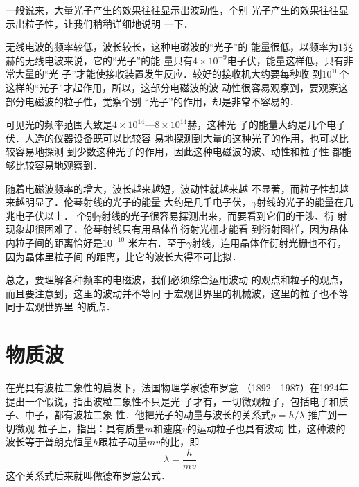 一般说来，大量光子产生的效果往往显示出波动性，个别
光子产生的效果往往显示出粒子性，让我们稍稍详细地说明
一下．

无线电波的频率较低，波长较长，这种电磁波的“光子”的
能量很低，以频率为1兆赫的无线电波来说，它的“光子”的能
量只有$4\times10^{-9}$电子伏，能量这样低，只有非常大量的“光
子”才能使接收装置发生反应．较好的接收机大约要每秒收
到$10^{10}$个这样的“光子”才起作用，所以，这部分电磁波的波
动性很容易观察到，要观察这部分电磁波的粒子性，觉察个别
“光子”的作用，却是非常不容易的．

可见光的频率范围大致是$4\times10^{14}$—$8\times10^{14}$赫，这种光
子的能量大约是几个电子伏．人造的仪器设备既可以比较容
易地探测到大量的这种光子的作用，也可以比较容易地探测
到少数这种光子的作用，因此这种电磁波的波、动性和粒子性
都能够比较容易地观察到．

随着电磁波频率的增大，波长越来越短，波动性就越来越
不显著，而粒子性却越来越明显了．伦琴射线的光子的能量
大约是几千电子伏，$\gamma$射线的光子的能量在几兆电子伏以上．
个别$\gamma$射线的光子很容易探测出来，而要看到它们的干涉、衍
射现象却很困难了．伦琴射线只有用晶体作衍射光栅才能看
到衍射图样，因为晶体内粒子间的距离恰好是$10^{-10}$
米左右．至于$\gamma$射线，连用晶体作衍射光栅也不行，因为晶体里粒子间
的距离，比它的波长大得不可比拟．

总之，要理解各种频率的电磁波，我们必须综合运用波动
的观点和粒子的观点，而且要注意到，这里的波动并不等同
于宏观世界里的机械波，这里的粒子也不等同于宏观世界里
的质点．

\section{物质波}
在光具有波粒二象性的启发下，法国物理学家德布罗意
（1892—1987）在1924年提出一个假说，指出波粒二象性不只是光
子才有，一切微观粒子，包括电子和质子、中子，都有波粒二象
性．他把光子的动量与波长的关系式$p=h/\lambda$
推广到一切微观
粒子上，指出：具有质量$m$和速度$v$的运动粒子也具有波动
性，这种波的波长等于普朗克恒量$h$跟粒子动量$mv$的比，即
\[\lambda=\frac{h}{mv} \]
这个关系式后来就叫做德布罗意公式．

